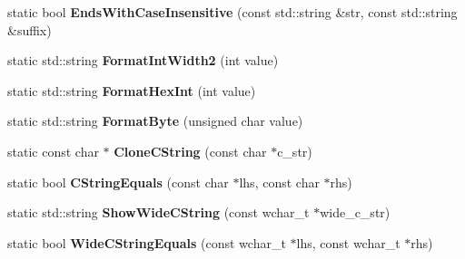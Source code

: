 \begin{DoxyCompactItemize}
\item 
\hypertarget{classtesting_1_1internal_1_1_string_a3de1df085eddc89ef3f3833c67aee3fe}{}static bool {\bfseries Ends\+With\+Case\+Insensitive} (const std\+::string \&str, const std\+::string \&suffix)\label{classtesting_1_1internal_1_1_string_a3de1df085eddc89ef3f3833c67aee3fe}

\item 
\hypertarget{classtesting_1_1internal_1_1_string_a51cab855f7ec6091e5886b6be5598ca2}{}static std\+::string {\bfseries Format\+Int\+Width2} (int value)\label{classtesting_1_1internal_1_1_string_a51cab855f7ec6091e5886b6be5598ca2}

\item 
\hypertarget{classtesting_1_1internal_1_1_string_a7bedf4780e0c938d203b73ddb17ff490}{}static std\+::string {\bfseries Format\+Hex\+Int} (int value)\label{classtesting_1_1internal_1_1_string_a7bedf4780e0c938d203b73ddb17ff490}

\item 
\hypertarget{classtesting_1_1internal_1_1_string_ab3555eeb6abe4b7c6f63d865af10379d}{}static std\+::string {\bfseries Format\+Byte} (unsigned char value)\label{classtesting_1_1internal_1_1_string_ab3555eeb6abe4b7c6f63d865af10379d}

\item 
\hypertarget{classtesting_1_1internal_1_1_string_a8bce6b1281ae3d2f9061b920aa78aca0}{}static const char $\ast$ {\bfseries Clone\+C\+String} (const char $\ast$c\+\_\+str)\label{classtesting_1_1internal_1_1_string_a8bce6b1281ae3d2f9061b920aa78aca0}

\item 
\hypertarget{classtesting_1_1internal_1_1_string_a06919f642bd47f0593196b460d352f24}{}static bool {\bfseries C\+String\+Equals} (const char $\ast$lhs, const char $\ast$rhs)\label{classtesting_1_1internal_1_1_string_a06919f642bd47f0593196b460d352f24}

\item 
\hypertarget{classtesting_1_1internal_1_1_string_acbf0511e9ae5009f42de77e565f6ba61}{}static std\+::string {\bfseries Show\+Wide\+C\+String} (const wchar\+\_\+t $\ast$wide\+\_\+c\+\_\+str)\label{classtesting_1_1internal_1_1_string_acbf0511e9ae5009f42de77e565f6ba61}

\item 
\hypertarget{classtesting_1_1internal_1_1_string_a4f5e053907ebced07fe0dc52dd2d1e85}{}static bool {\bfseries Wide\+C\+String\+Equals} (const wchar\+\_\+t $\ast$lhs, const wchar\+\_\+t $\ast$rhs)\label{classtesting_1_1internal_1_1_string_a4f5e053907ebced07fe0dc52dd2d1e85}


\end{DoxyCompactItemize}
